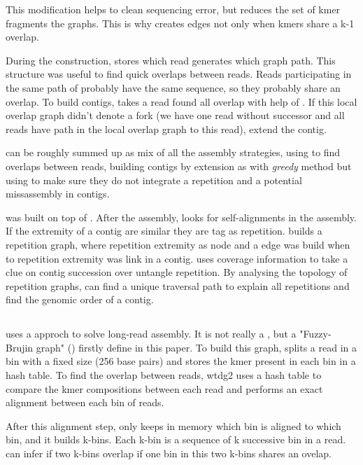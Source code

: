 \documentclass[main]{subfiles}
\begin{document}
This modification helps to clean sequencing error, but reduces the set of kmer fragments the \DBG graphs. This is why  creates edges not only when kmers share a k-1 overlap. 

During the  construction, \abruijn stores which read generates which graph path. This structure was useful to find quick overlaps between reads. Reads participating in the same path of  probably have the same sequence, so they probably share an overlap. To build contigs, \abruijn takes a read found all overlap with help of . If this local overlap graph didn't denote a fork (we have one read without successor and all reads have path in the local overlap graph to this read), \abruijn extend the contig.

\abruijn can be roughly summed up as mix of all the assembly strategies, using \DBG to find overlaps between reads, building contigs by extension as with \textit{greedy} method but using \OLC to make sure they do not integrate a repetition and a potential missassembly in contigs.

\flye was built on top of \abruijn. After the \abruijn assembly, \flye looks for self-alignments in the assembly. If the extremity of a contig are similar they are tag as repetition. \flye builds a repetition graph, where repetition extremity as node and a edge was build when to repetition extremity was link in a contig. \flye uses coverage information to take a clue on contig succession over untangle repetition. By analysing the topology of repetition graphs, \flye can find a unique traversal path to explain all repetitions and find the genomic order of a contig.

\subsection{\wtdbg}

\wtdbg \cite{wtdbg2}  uses a \DBG approch to solve long-read assembly. It is not really a \DBG, but a "Fuzzy-Brujin graph" () firstly define in this paper. To build this graph, \wtdbg splits a read in a bin with a fixed size (256 base pairs) and stores the kmer present in each bin in a hash table.
To find the overlap between reads, wtdg2 uses a hash table to compare the kmer compositions between each read and performs an exact alignment between each bin of reads.

After this alignment step, \wtdbg only keeps in memory which bin is aligned to which bin, and it builds k-bins. Each k-bin is a sequence of k successive bin in a read. \wtdbg can infer if two k-bins overlap if one bin in this two k-bins shares an ovelap.
\end{document}
